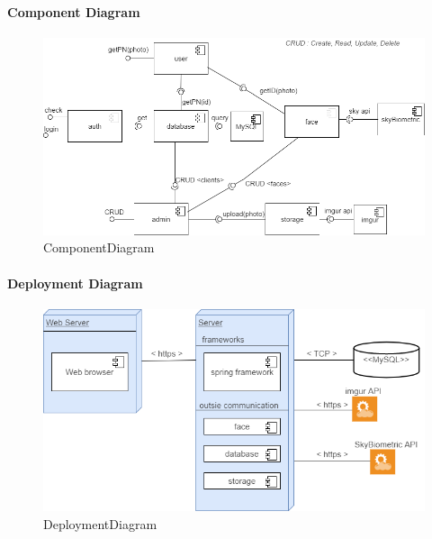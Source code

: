 \documentclass[a4paper,11pt]{article}
\begin{document}
\paragraph{Component Diagram}\label{component-diagram}

\begin{figure}[ht!]
	\centering
	\includegraphics[width=150mm]{Architecture/ComponentDiagram.png}
	\caption{ComponentDiagram}
\end{figure}

\paragraph{Deployment Diagram}\label{deployment-diagram}

\begin{figure}[ht!]
	\centering
	\includegraphics[width=150mm]{Architecture/DeploymentDiagram.png}
	\caption{DeploymentDiagram}
\end{figure}

\newpage
\end{document}
